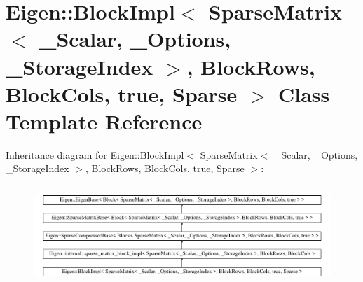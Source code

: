 \hypertarget{class_eigen_1_1_block_impl_3_01_sparse_matrix_3_01___scalar_00_01___options_00_01___storage_inded3daac10033a16d6ca9aea81cdfe7eee}{}\section{Eigen\+::Block\+Impl$<$ Sparse\+Matrix$<$ \+\_\+\+Scalar, \+\_\+\+Options, \+\_\+\+Storage\+Index $>$, Block\+Rows, Block\+Cols, true, Sparse $>$ Class Template Reference}
\label{class_eigen_1_1_block_impl_3_01_sparse_matrix_3_01___scalar_00_01___options_00_01___storage_inded3daac10033a16d6ca9aea81cdfe7eee}
Inheritance diagram for Eigen\+::Block\+Impl$<$ Sparse\+Matrix$<$ \+\_\+\+Scalar, \+\_\+\+Options, \+\_\+\+Storage\+Index $>$, Block\+Rows, Block\+Cols, true, Sparse $>$\+:\begin{figure}[H]
\begin{center}
\leavevmode
\includegraphics[height=3.819918cm]{class_eigen_1_1_block_impl_3_01_sparse_matrix_3_01___scalar_00_01___options_00_01___storage_inded3daac10033a16d6ca9aea81cdfe7eee}
\end{center}
\end{figure}
